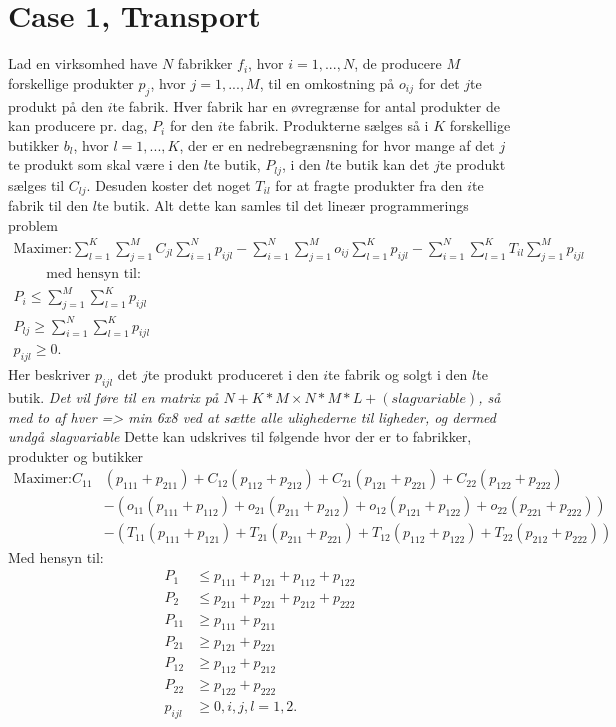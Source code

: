 
\section{Case 1, Transport}
Lad en virksomhed have $N$ fabrikker $f_i$, hvor $i = 1,...,N$, de producere $M$ forskellige produkter $p_j$, hvor $j = 1,..., M$, til en omkostning på $o_{ij}$ for det $j$te produkt på den $i$te fabrik. 
Hver fabrik har en øvregrænse for antal produkter de kan producere pr. dag, $P_i$ for den $i$te fabrik.
Produkterne sælges så i $K$ forskellige butikker $b_l$, hvor $l= 1,...,K$, der er en nedrebegrænsning for hvor mange af det $j$te produkt som skal være i den $l$te butik, $P_{lj}$, i den $l$te butik kan det $j$te produkt sælges til $C_{lj}$.
Desuden koster det noget $T_{il}$ for at fragte produkter fra den $i$te fabrik til den $l$te butik.
Alt dette kan samles til det lineær programmerings problem
\begin{align*}
\text{Maximer:} \sum_{l=1}^K \sum_{j=1}^M C_{jl} \sum_{i=1}^N p_{ijl} - \sum_{i=1}^N\sum_{j=1}^M o_{ij} \sum_{l=1}^K p_{ijl} - \sum_{i=1}^N \sum_{l=1}^K T_{il} \sum_{j=1}^M p_{ijl}
\\\qquad \text{ med hensyn til:}
\\ P_i \leq \sum_{j=1}^M \sum_{l=1}^K p_{ijl}
\\ P_{lj} \geq  \sum_{i=1}^N \sum_{l=1}^K p_{ijl}
\\ p_{ijl} \geq 0.
\end{align*}
Her beskriver $p_{ijl}$ det $j$te produkt produceret i den $i$te fabrik og solgt i den $l$te butik.
\textit{Det vil føre til en matrix på $N+K*M \times N*M*L+(slag variable)$, så med to af hver => min 6x8 ved at sætte alle ulighederne til ligheder, og dermed undgå slagvariable}
Dette kan udskrives til følgende hvor der er to fabrikker, produkter og butikker
\begin{align*}
\text{Maximer:}  
C_{11}& ( p_{111} +  p_{211}) + C_{12} ( p_{112} +  p_{212}) + C_{21} ( p_{121} +  p_{221}) + C_{22} ( p_{122} +  p_{222})
\\ &- (o_{11} ( p_{111} + p_{112}) + o_{21} ( p_{211} + p_{212}) + o_{12} ( p_{121} + p_{122}) + o_{22} ( p_{221} + p_{222}))
\\&- ( T_{11} ( p_{111} + p_{121}) + T_{21} ( p_{211} + p_{221})  + T_{12} ( p_{112} + p_{122}) + T_{22} ( p_{212} + p_{222}) )
\end{align*}
Med hensyn til:
\begin{align*}
 P_1 & \leq p_{111} + p_{121} + p_{112} + p_{122}
\\ P_2 & \leq p_{211} + p_{221} + p_{212} + p_{222}
\\ P_{11} & \geq p_{111} + p_{211}
\\ P_{21} & \geq p_{121} + p_{221}
\\ P_{12} & \geq p_{112} + p_{212}
\\ P_{22} & \geq p_{122} + p_{222}
\\ p_{ijl} & \geq 0, i,j,l = 1, 2.
\end{align*}